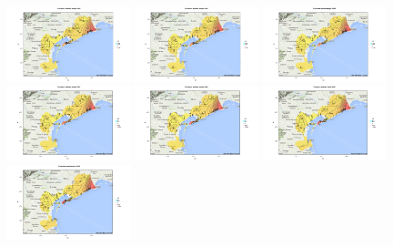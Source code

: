 \documentclass[a4paper,11pt,twoside,openright]{book}							%
\begin{document}
\begin{figure}[H]
\includegraphics[trim=0cm 0cm 4cm 0cm,clip=true,width=0.32\textwidth]{Immagini/venezia_con_covariate/Maps2004.png}
\includegraphics[trim=0cm 0cm 4cm 0cm,clip=true,width=0.32\textwidth]{Immagini/venezia_con_covariate/Maps2005.png}
\includegraphics[trim=0cm 0cm 4cm 0cm,clip=true,width=0.32\textwidth]{Immagini/venezia_con_covariate/Maps2006.png}
\includegraphics[trim=0cm 0cm 4cm 0cm,clip=true,width=0.32\textwidth]{Immagini/venezia_con_covariate/Maps2007.png}
\includegraphics[trim=0cm 0cm 4cm 0cm,clip=true,width=0.32\textwidth]{Immagini/venezia_con_covariate/Maps2008.png}
\includegraphics[trim=0cm 0cm 4cm 0cm,clip=true,width=0.32\textwidth]{Immagini/venezia_con_covariate/Maps2009.png}
\includegraphics[trim=0cm 0cm 4cm 0cm,clip=true,width=0.32\textwidth]{Immagini/venezia_con_covariate/Maps2010.png}

\end{figure}
\end{document}
